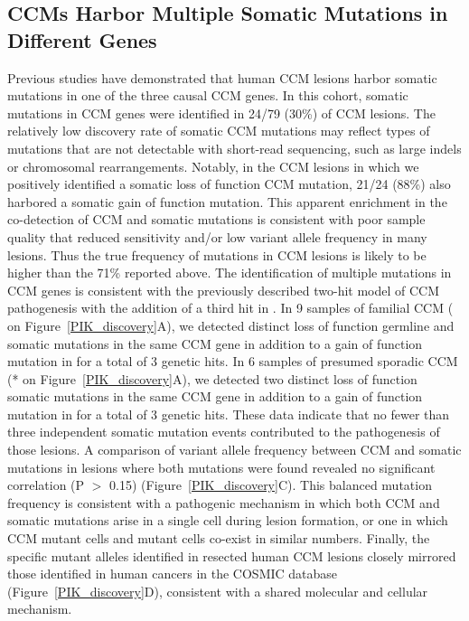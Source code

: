 \subsection{CCMs Harbor Multiple Somatic Mutations in Different Genes}
Previous studies have demonstrated that human CCM lesions harbor somatic mutations in one of the three causal CCM genes. In this cohort, somatic mutations in CCM genes were identified in 24/79 (30\%) of CCM lesions. The relatively low discovery rate of somatic CCM mutations may reflect types of mutations that are not detectable with short-read sequencing, such as large indels or chromosomal rearrangements. Notably, in the CCM lesions in which we positively identified a somatic loss of function CCM mutation, 21/24 (88\%) also harbored a somatic gain of function  mutation. This apparent enrichment in the co-detection of CCM and  somatic mutations is consistent with poor sample quality that reduced sensitivity and/or low variant allele frequency in many lesions. Thus the true frequency of  mutations in CCM lesions is likely to be higher than the 71\% reported above. The identification of multiple mutations in CCM genes is consistent with the previously described two-hit model of CCM pathogenesis with the addition of a third hit in .  In 9 samples of familial CCM (\ddag ~ on Figure~\ref{PIK_discovery}A), we detected distinct loss of function germline and somatic mutations in the same CCM gene in addition to a gain of function mutation in  for a total of 3 genetic hits. In 6 samples of presumed sporadic CCM (*  on Figure~\ref{PIK_discovery}A), we detected two distinct loss of function somatic mutations in the same CCM gene in addition to a gain of function mutation in  for a total of 3 genetic hits. These data indicate that no fewer than three independent somatic mutation events contributed to the pathogenesis of those lesions. A comparison of variant allele frequency between CCM and  somatic mutations in lesions where both mutations were found revealed no significant correlation (P $>$ 0.15) (Figure~\ref{PIK_discovery}C). This balanced mutation frequency is consistent with a pathogenic mechanism in which both CCM and  somatic mutations arise in a single cell during lesion formation, or one in which CCM mutant cells and  mutant cells co-exist in similar numbers. Finally, the specific mutant  alleles identified in resected human CCM lesions closely mirrored those identified in human cancers in the COSMIC database (Figure~\ref{PIK_discovery}D), consistent with a shared molecular and cellular mechanism. 

